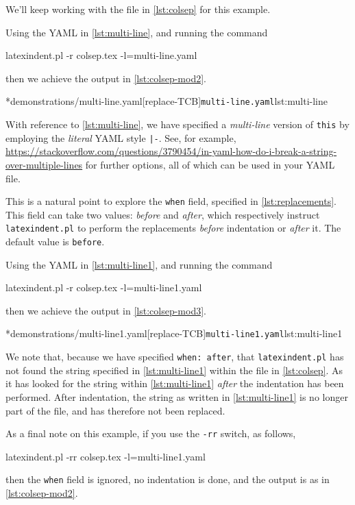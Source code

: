 	\begin{example}
		We'll keep working with the file in \vref{lst:colsep} for this example.

		Using the YAML in \cref{lst:multi-line}, and running the command
		\begin{commandshell}
latexindent.pl -r colsep.tex -l=multi-line.yaml
\end{commandshell}
		then we achieve the output in \cref{lst:colsep-mod2}.
		\begin{cmhtcbraster}[raster column skip=.01\linewidth]
			\cmhlistingsfromfile[style=yaml-LST]*{demonstrations/multi-line.yaml}[replace-TCB]{\texttt{multi-line.yaml}}{lst:multi-line}
		\end{cmhtcbraster}
		With reference to \cref{lst:multi-line}, we have specified a \emph{multi-line} version of \texttt{this} by employing the \emph{literal}
		YAML style \lstinline!|-!. See, for example, \href{https://stackoverflow.com/questions/3790454/in-yaml-how-do-i-break-a-string-over-multiple-lines}{https://stackoverflow.com/questions/3790454/in-yaml-how-do-i-break-a-string-over-multiple-lines}
		for further options, all of which can be used in your YAML file.

		This is a natural point to explore the \texttt{when} field, specified in \vref{lst:replacements}. This field can take two values: \emph{before}
		and \emph{after}, which respectively instruct \texttt{latexindent.pl} to perform the replacements \emph{before} indentation or \emph{after} it.
		The default value is \texttt{before}.

		Using the YAML in \cref{lst:multi-line1}, and running the command
		\begin{commandshell}
latexindent.pl -r colsep.tex -l=multi-line1.yaml
\end{commandshell}
		then we achieve the output in \cref{lst:colsep-mod3}.
		\begin{cmhtcbraster}[raster column skip=.01\linewidth]
			\cmhlistingsfromfile[style=yaml-LST]*{demonstrations/multi-line1.yaml}[replace-TCB]{\texttt{multi-line1.yaml}}{lst:multi-line1}
		\end{cmhtcbraster}
		We note that, because we have specified \texttt{when: after}, that \texttt{latexindent.pl} has not found the string specified
		in \cref{lst:multi-line1} within the file in \vref{lst:colsep}. As it has looked for the string within \cref{lst:multi-line1} \emph{after} the indentation has been performed. After
		indentation, the string as written in \cref{lst:multi-line1} is no longer part of the file, and has therefore not been replaced.

		As a final note on this example, if you use the \texttt{-rr} switch, as follows,
		\begin{commandshell}
latexindent.pl -rr colsep.tex -l=multi-line1.yaml
\end{commandshell}
		then the \texttt{when} field is ignored, no indentation is done, and the output is as in \cref{lst:colsep-mod2}.
	\end{example}

